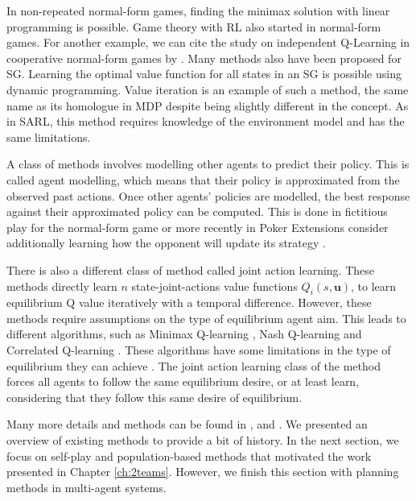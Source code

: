 In non-repeated normal-form games, finding the minimax solution with linear programming \citep{marl-book} is possible.
Game theory with RL also started in normal-form games.
For another example, we can cite the study on independent Q-Learning in cooperative normal-form games by \cite{claus1998dynamics}.
Many methods also have been proposed for SG.
Learning the optimal value function for all states in an SG is possible using dynamic programming.
Value iteration \citep{stochasticGames} is an example of such a method, the same name as its homologue in MDP \citep{sutton2018reinforcement} despite being slightly different in the concept.
As in SARL, this method requires knowledge of the environment model and has the same limitations.

A class of methods involves modelling other agents to predict their policy.
This is called agent modelling, which means that their policy is approximated from the observed past actions.
Once other agents' policies are modelled, the best response against their approximated policy can be computed.
This is done in fictitious play \citep{brown1951iterative} for the normal-form game or more recently in Poker \citep{pmlr-v37-heinrich15} 
Extensions consider additionally learning how the opponent will update its strategy \citep{he2016opponent, foerster2017learning}.

There is also a different class of method called joint action learning.
These methods directly learn $n$ state-joint-actions value functions $Q_i(s, \mathbf{u})$, to learn equilibrium Q value iteratively with a temporal difference.
However, these methods require assumptions on the type of equilibrium agent aim.
This leads to different algorithms, such as Minimax Q-learning \citep{MarkovGames}, Nash Q-learning \citep{hu2003nash} and Correlated Q-learning \citep{greenwald2003correlated}.
These algorithms have some limitations in the type of equilibrium they can achieve \citep{marl-book}.
The joint action learning class of the method forces all agents to follow the same equilibrium desire, or at least learn, considering that they follow this same desire of equilibrium.

Many more details and methods can be found in \citep{marl-book}, \citep{Nowe2012GTMARL} and \citep{russel2010}.
We presented an overview of existing methods to provide a bit of history.
In the next section, we focus on self-play and population-based methods that motivated the work presented in Chapter \ref{ch:2teams}.
However, we finish this section with planning methods in multi-agent systems.

